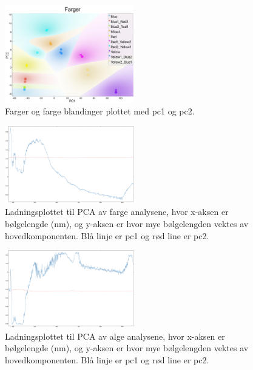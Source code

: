 \documentclass[twocolumn, 11pt]{article} %
\begin{document}
\begin{figure}[H]
\includegraphics[width=0.5\textwidth]{Lab3/Images/Farger_alle_PCA.png}
\caption{Farger og farge blandinger plottet med pc1 og pc2.}
\label{farge_pca}
\end{figure}

\begin{figure}[H]
\includegraphics[width=0.5\textwidth]{Lab3/Images/Farger_Alle_Ladningsplott.png}
\caption{Ladningsplottet til PCA av farge analysene, hvor x-aksen er bølgelengde (nm), og y-aksen er hvor mye bølgelengden vektes av hovedkomponenten. Blå linje er pc1 og rød line er pc2.}
\label{farge_ladningsplott}
\end{figure}


\begin{figure}[H]
\includegraphics[width=0.5\textwidth]{Lab3/Images/Alger_alle_ladningsplott.png}
\caption{Ladningsplottet til PCA av alge analysene, hvor x-aksen er bølgelengde (nm), og y-aksen er hvor mye bølgelengden vektes av hovedkomponenten. Blå linje er pc1 og rød line er pc2.}
\label{alger_ladningsplott}
\end{figure}
\end{document}
